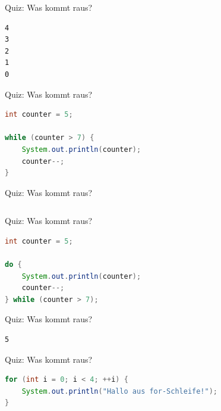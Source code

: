 \documentclass[18pt]{beamer}
\begin{document}
\begin{frame}[fragile]{Quiz: Was kommt raus?}
    \begin{block}{}
        \begin{lstlisting}
4
3
2
1
0
        \end{lstlisting}
    \end{block}
\end{frame}
\begin{frame}[fragile]{Quiz: Was kommt raus?}
    \begin{exampleblock}{}
        \begin{lstlisting}[language=Java]
int counter = 5;

while (counter > 7) {
    System.out.println(counter);
    counter--;
}
        \end{lstlisting}
    \end{exampleblock}
\end{frame}

\begin{frame}[fragile]{Quiz: Was kommt raus?}
    \begin{block}{}
        \begin{lstlisting}

        \end{lstlisting}
    \end{block}
\end{frame}
\begin{frame}[fragile]{Quiz: Was kommt raus?}
    \begin{exampleblock}{}
        \begin{lstlisting}[language=Java]
int counter = 5;

do {
    System.out.println(counter);
    counter--;
} while (counter > 7);
        \end{lstlisting}
    \end{exampleblock}
\end{frame}

\begin{frame}[fragile]{Quiz: Was kommt raus?}
    \begin{block}{}
        \begin{lstlisting}
5
        \end{lstlisting}
    \end{block}
\end{frame}
\begin{frame}[fragile]{Quiz: Was kommt raus?}
    \begin{exampleblock}{}
        \begin{lstlisting}[language=Java]
for (int i = 0; i < 4; ++i) {
    System.out.println("Hallo aus for-Schleife!");
}
        \end{lstlisting}
    \end{exampleblock}
\end{frame}
\end{document}
